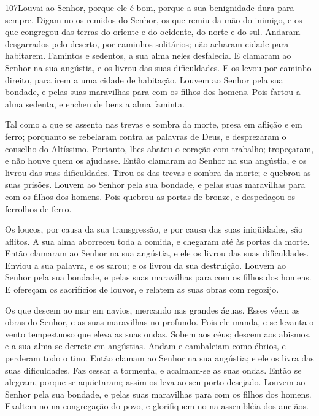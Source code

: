 \bigskip

\lettrine{107}{}Louvai ao Senhor, porque ele é bom, porque a
sua benignidade dura para sempre. Digam-no os remidos do Senhor,
os que remiu da mão do inimigo, e os que congregou das terras do
oriente e do ocidente, do norte e do sul. Andaram desgarrados
pelo deserto, por caminhos solitários; não acharam cidade para
habitarem. Famintos e sedentos, a sua alma neles desfalecia.
E clamaram ao Senhor na sua angústia, e os livrou das suas
dificuldades. E os levou por caminho direito, para irem a uma
cidade de habitação. Louvem ao Senhor pela sua bondade, e pelas
suas maravilhas para com os filhos dos homens. Pois fartou a
alma sedenta, e encheu de bens a alma faminta.

Tal como a que se assenta nas trevas e sombra da morte, presa em
aflição e em ferro; porquanto se rebelaram contra as palavras
de Deus, e desprezaram o conselho do Altíssimo. Portanto,
lhes abateu o coração com trabalho; tropeçaram, e não houve quem os
ajudasse. Então clamaram ao Senhor na sua angústia, e os
livrou das suas dificuldades. Tirou-os das trevas e sombra da
morte; e quebrou as suas prisões. Louvem ao Senhor pela sua
bondade, e pelas suas maravilhas para com os filhos dos homens.
Pois quebrou as portas de bronze, e despedaçou os ferrolhos
de ferro.

Os loucos, por causa da sua transgressão, e por causa das suas
iniqüidades, são aflitos. A sua alma aborreceu toda a comida,
e chegaram até às portas da morte. Então clamaram ao Senhor
na sua angústia, e ele os livrou das suas dificuldades.
Enviou a sua palavra, e os sarou; e os livrou da sua
destruição. Louvem ao Senhor pela sua bondade, e pelas suas
maravilhas para com os filhos dos homens. E ofereçam os
sacrifícios de louvor, e relatem as suas obras com regozijo.

Os que descem ao mar em navios, mercando nas grandes águas.
Esses vêem as obras do Senhor, e as suas maravilhas no
profundo. Pois ele manda, e se levanta o vento tempestuoso
que eleva as suas ondas. Sobem aos céus; descem aos abismos,
e a sua alma se derrete em angústias. Andam e cambaleiam como
ébrios, e perderam todo o tino. Então clamam ao Senhor na sua
angústia; e ele os livra das suas dificuldades. Faz cessar a
tormenta, e acalmam-se as suas ondas. Então se alegram,
porque se aquietaram; assim os leva ao seu porto desejado.
Louvem ao Senhor pela sua bondade, e pelas suas maravilhas
para com os filhos dos homens. Exaltem-no na congregação do
povo, e glorifiquem-no na assembléia dos anciãos.

